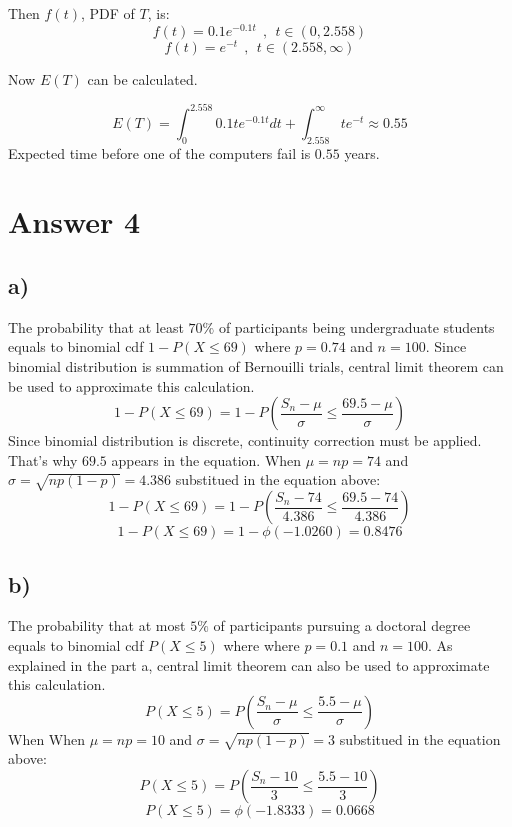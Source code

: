 \documentclass[12pt]{article}
\begin{document}
Then $f(t)$, PDF of $T$, is:
	\begin{equation*}
		f(t) = 0.1e^{-0.1t} \ \ , \ \ t \in (0, 2.558)
	\end{equation*}
	\begin{equation*}
		f(t) = e^{-t} \ \ , \ \ t \in (2.558, \infty)
	\end{equation*}

Now $E(T)$ can be calculated.

\begin{equation*}
	E(T) = \int_{0}^{2.558} 0.1te^{-0.1t} dt + \int_{2.558}^{\infty} te^{-t} \approx 0.55
\end{equation*}
Expected time before one of the computers fail is $0.55$ years.

\section*{Answer 4}
\subsection*{a)}
The probability that at least $70\%$ of participants being undergraduate students equals to binomial cdf $1-P(X \leq 69)$ where $p=0.74$ and $n=100$. Since binomial distribution is summation of Bernouilli trials, central limit theorem can be used to approximate this calculation.
	\begin{equation*}
		1-P(X \leq 69) = 1-P \left(\frac{S_n - \mu}{\sigma}  \leq \frac{69.5 - \mu}{\sigma} \right)
	\end{equation*}
Since binomial distribution is discrete, continuity correction must be applied. That's why $69.5$ appears in the equation. When $\mu = np = 74$ and $\sigma = \sqrt{np(1-p)} = 4.386$ substitued in the equation above:
	\begin{equation*}
		1-P(X \leq 69) = 1-P \left( \frac{S_n - 74}{4.386}  \leq \frac{69.5 - 74}{4.386} \right)
	\end{equation*}
	\begin{equation*}
		1-P(X \leq 69) = 1-\phi(-1.0260) = 0.8476
	\end{equation*}
\subsection*{b)}
The probability that at most $5\%$ of participants pursuing a doctoral degree equals to binomial cdf $P(X \leq 5)$ where where $p=0.1$ and $n=100$. As explained in the part a, central limit theorem can also be used to approximate this calculation.
	\begin{equation*}
		P(X \leq 5) = P \left(\frac{S_n - \mu}{\sigma}  \leq \frac{5.5 - \mu}{\sigma} \right)
	\end{equation*}
When When $\mu = np = 10$ and $\sigma = \sqrt{np(1-p)} = 3$ substitued in the equation above:
	\begin{equation*}
		P(X \leq 5) = P \left(\frac{S_n - 10}{3}  \leq \frac{5.5 - 10}{3} \right)
	\end{equation*}
	\begin{equation*}
		P(X \leq 5) = \phi(-1.8333) = 0.0668
	\end{equation*}
\end{document}
